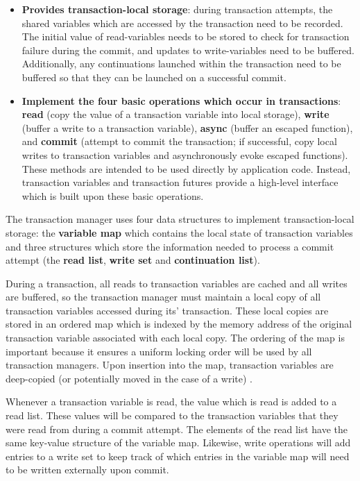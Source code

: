 \documentclass[conference]{IEEEtran}
\begin{document}
\begin{itemize}
\item \textbf{Provides transaction-local storage}: during transaction attempts, the
shared variables which are accessed by the transaction need to be recorded. The
initial value of read-variables needs to be stored to check for transaction
failure during the commit, and updates to write-variables need to be buffered.
Additionally, any continuations launched within the transaction need to be
buffered so that they can be launched on a successful commit.
\item \textbf{Implement the four basic operations which occur in transactions}:
\textbf{read} (copy the value of a transaction variable into local storage), \textbf{write} (buffer a write to a transaction variable), \textbf{async} (buffer an escaped function), and
\textbf{commit} (attempt to commit the transaction; if successful, copy local writes to transaction variables and asynchronously evoke escaped functions). These methods are intended to be used directly by application code. Instead, transaction variables and transaction futures provide a high-level interface which is built upon these basic operations. 
\end{itemize}

The transaction manager uses four data structures to implement transaction-local
storage: the \textbf{variable map} which contains the local state of transaction variables and three
structures which store the information needed to process a commit attempt (the \textbf{read list}, \textbf{write set} and \textbf{continuation list}). 

During a transaction, all reads to transaction variables are cached and all writes are buffered, so the transaction manager must maintain a local copy of all transaction variables accessed during its' transaction. These local copies are stored in an ordered map which is indexed by the memory address
of the original transaction variable associated with each local copy. The ordering of the map is important because it ensures a uniform locking order will be used by all transaction managers. Upon insertion into
the map, transaction variables are deep-copied (or potentially moved in the case of a write) .

Whenever a transaction variable is read, the value which is read is added to a read list. These values will be compared to the transaction variables that they were read from during a commit attempt. The elements
of the read list have the same key-value structure of the variable map. Likewise, write operations will add entries to a write set to keep track
of which entries in the variable map will need to be written externally upon
commit.
\end{document}
